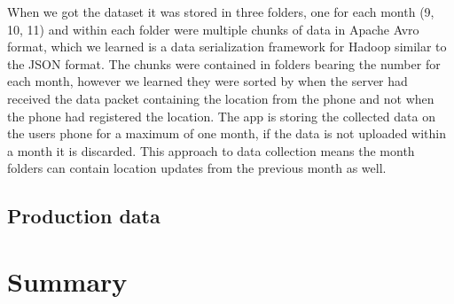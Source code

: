 When we got the dataset it was stored in three folders, one for each month (9, 10, 11) and within each folder were multiple chunks of data in Apache Avro format\cite{apacheavro}, which we learned is a data serialization framework for Hadoop similar to the JSON format. The chunks were contained in folders bearing the number for each month, however we learned they were sorted by when the server had received the data packet containing the location from the phone and not when the phone had registered the location. The app is storing the collected data on the users phone for a maximum of one month, if the data is not uploaded within a month it is discarded. This approach to data collection means the month folders can contain location updates from the previous month as well.


\subsection{Production data}


\section{Summary}